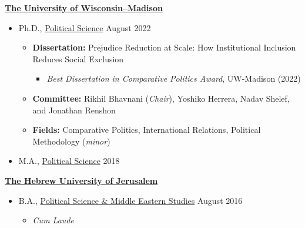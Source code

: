\documentclass[11pt]{article}
\newenvironment{outerlist}[1][\enskip\textbullet]%
        {\begin{itemize}[#1,leftmargin=*]}{\end{itemize}%
         \vspace{-.6\baselineskip}}
\newenvironment{innerlist}[1][\enskip\textbullet]%
        {\begin{itemize}[#1,leftmargin=*,parsep=0pt,itemsep=0pt,topsep=0pt,partopsep=0pt]}
        {\end{itemize}}
\begin{document}
\href{http://polisci.wisc.edu}{\textbf{The University of Wisconsin--Madison}}
\begin{outerlist}

\item[] Ph.D.,
        \href{http://polisci.wisc.edu}
             {Political Science}
           \hfill August 2022
        \begin{innerlist}
        \item \textbf{Dissertation:} Prejudice Reduction at Scale: How Institutional Inclusion Reduces Social Exclusion  
                 \begin{itemize}[label=$\star$]
		 \item \emph{Best Dissertation in Comparative Politics Award}, UW-Madison (2022)
		\end{itemize}      
        \item \textbf{Committee:} Rikhil Bhavnani (\emph{Chair}), Yoshiko Herrera, Nadav Shelef, and Jonathan Renshon
        \item \textbf{Fields:} Comparative Politics, International Relations, Political Methodology (\emph{minor})
        \end{innerlist}


\item[] M.A.,
        \href{http://polisci.wisc.edu}
             {Political Science} \hfill {2018}
\end{outerlist}  \vspace{.1in}

\href{http://new.huji.ac.il/en}{\textbf{The Hebrew University of Jerusalem}}
\begin{outerlist}
\item[] B.A.,
        \href{https://en.politics.huji.ac.il/}
             {Political Science \& Middle Eastern Studies} \hfill {August 2016}
        \begin{innerlist}
        \item \emph{Cum Laude}
        \end{innerlist}

\end{outerlist}
\end{document}
